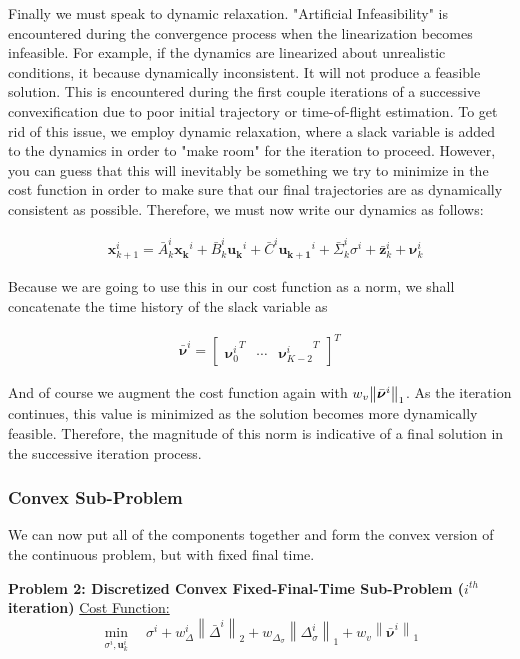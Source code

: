 \documentclass[conf]{new-aiaa}
\begin{document}
\begin{singlespace}
Finally we must speak to dynamic relaxation. "Artificial Infeasibility" is  encountered during the convergence process when the linearization becomes infeasible. For example, if the dynamics are linearized about unrealistic conditions, it because dynamically inconsistent. It will not produce a feasible solution. This is encountered during the first couple iterations of a successive convexification due to poor initial trajectory or time-of-flight estimation. To get rid of this issue, we employ dynamic relaxation, where a slack variable is added to the dynamics in order to "make room" for the iteration to proceed. However, you can guess that this will inevitably be something we try to minimize in the cost function in order to make sure that our final trajectories are as dynamically consistent as possible. Therefore, we must now write our dynamics as follows: 

\begin{align}
& \mathbf{x}_{k+1}^i = \bar{A}_k^i\mathbf{x_k}^i + \bar{B}_k^i\mathbf{u_k}^i + \bar{C}^i\mathbf{u_{k+1}}^i + \bar{\Sigma}_k^i\sigma^i + \bar{\mathbf{z}}^i_k + \bm{\nu}_k^i
\end{align}

Because we are going to use this in our cost function as a norm, we shall concatenate the time history of the slack variable as

\begin{align}
\bar{\bm{\nu}}^i = 
	\begin{bmatrix}
	{\bm{\nu}_0^i}^T & \cdots & {\bm{\nu}^i_{K-2}}^T 
	\end{bmatrix}^T
\end{align}

And of course we augment the cost function again with $w_v \norm{\bar{\bm{\nu}}^i}_1$. As the iteration continues, this value is minimized as the solution becomes more dynamically feasible. Therefore, the magnitude of this norm is indicative of a final solution in the successive iteration process.

\clearpage
\subsubsection{Convex Sub-Problem}
We can now put all of the components together and form the convex version of the continuous problem, but with fixed final time.

\begin{mdframed}
\textbf{Problem 2: Discretized Convex Fixed-Final-Time Sub-Problem ($i^{th}$ iteration)}
\underline{Cost Function:}
\begin{equation*}
\min_{\sigma^i, \mathbf{u}_k^i} \quad \sigma^i + w_\Delta^i \left\lVert \bar{\Delta}^i \right\lVert_2 + w_{\Delta_\sigma}\left\lVert\Delta_\sigma^i\right\lVert_1 + w_v \left\lVert\bar{\bm{\nu}}^i\right\lVert_1
\end{equation*}


\end{mdframed}
\end{singlespace}
\end{document}
